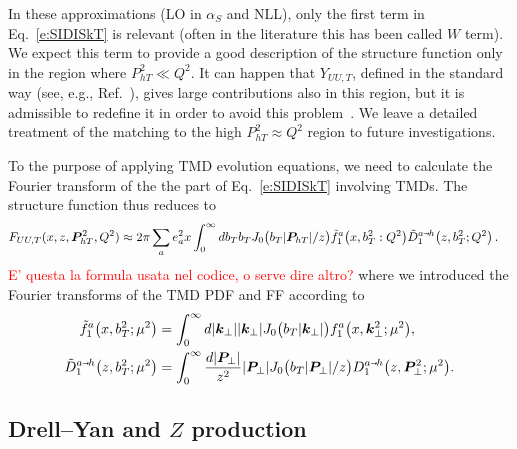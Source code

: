 \documentclass[aps,preprintnumbers,showpacs,nofootinbib,superscriptaddress,floatfix]{revtex4}
\newcommand{\AS}[1]{{\textcolor[rgb]{1,0,1}{#1}}}
\newcommand{\smarrow}{\mbox{\raisebox{-4.5pt}[0pt][0pt]{$\hspace{-1pt} 
		\vec{\phantom{v}}$}}}
\newcommand{\T}{\perp}
\newcommand{\Tperp}{T}
\newcommand{\bT}{b_T}
\begin{document}
In these approximations (LO in $\alpha_S$ and NLL), only the first term in
Eq.~\eqref{e:SIDISkT} is relevant (often in the
literature this has been called $W$ term). We expect this term to provide a
good description of the
structure function only in the region where $P_{hT}^2 \ll Q^2$. 
It can happen that $Y_{UU,T}$, defined
in the standard way (see, e.g., Ref.~\cite{Collins:1984kg}), gives large
contributions also in this region, but it is admissible to
redefine it in order to avoid this problem~\cite{Collins:2016hqq}. 
We leave a detailed treatment of the matching to the high $P_{hT}^2 \approx Q^2$
region to future investigations.   

To the purpose of applying TMD evolution equations, 
\AS{we} need to calculate the Fourier transform of the the part of 
Eq.~\eqref{e:SIDISkT} involving TMDs. The structure function thus reduces to 
\begin{align}
\label{e:SIDISkTFF}
   F_{UU,T}(x,z, \bm{P}_{h \Tperp}^2, Q^2) &\approx 2\pi \sum_a e_a^2 x 
       \int_0^{\infty} {d \bT} \bT J_0\big(\bT |\bm{P}_{hT}|/z\big)
      \tilde{f}_1^a\big(x, \bT^2:Q^2\big) \tilde{D}_1^{a\smarrow h}\big(z, \bT^2;
      Q^2 \big) 
\nonumber \, .
\end{align} 
\textcolor{red}{ E' questa la formula usata nel codice, o serve dire altro?}
where we introduced the Fourier transforms of the TMD PDF and FF according to
\begin{align} 
\tilde{f}_1^a\big(x, \bT^2;\mu^2\big) &=
\int_0^{\infty} d |\bm{k}_\T| 
                |\bm{k}_\T|J_0\big(\bT |\bm{k}_\T|\big) 
       f_1^a\big(x, \bm{k}_\T^2;\mu^2\big),
\\
\tilde{D}_1^{a\smarrow h}\big(z, \bT^2; \mu^2 \big) &=
\int_0^{\infty} \frac{d |\bm{P}_{\T}|}{z^2} |\bm{P}_{\T}| 
                                             J_0\big(\bT |\bm{P}_{\T}|/z\big)
       D_1^{a\smarrow h}\big(z, \bm{P}_{\T}^2; \mu^2 \big).
\end{align}  


\subsection{\AS{Drell--Yan and $Z$ production}}
\label{ss:DY_formalism}
\end{document}
